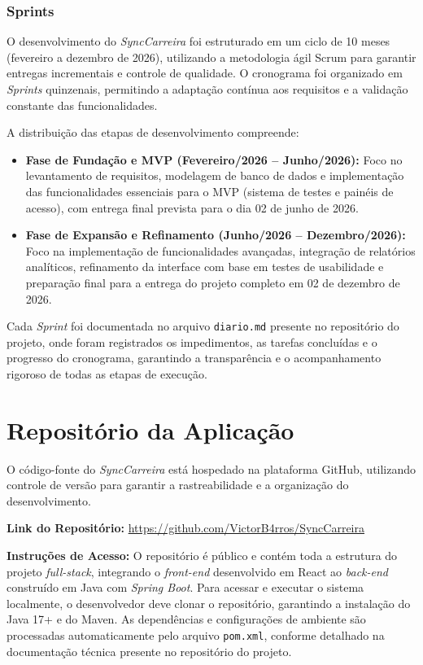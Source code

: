 \subsubsection{Sprints}

O desenvolvimento do \textit{SyncCarreira} foi estruturado em um ciclo de 10 meses (fevereiro a dezembro de 2026), utilizando a metodologia ágil Scrum para garantir entregas incrementais e controle de qualidade. O cronograma foi organizado em \textit{Sprints} quinzenais, permitindo a adaptação contínua aos requisitos e a validação constante das funcionalidades.

A distribuição das etapas de desenvolvimento compreende:

\begin{itemize}
    \item \textbf{Fase de Fundação e MVP (Fevereiro/2026 -- Junho/2026):} Foco no levantamento de requisitos, modelagem de banco de dados e implementação das funcionalidades essenciais para o MVP (sistema de testes e painéis de acesso), com entrega final prevista para o dia 02 de junho de 2026.

    \item \textbf{Fase de Expansão e Refinamento (Junho/2026 -- Dezembro/2026):} Foco na implementação de funcionalidades avançadas, integração de relatórios analíticos, refinamento da interface com base em testes de usabilidade e preparação final para a entrega do projeto completo em 02 de dezembro de 2026.
\end{itemize}

Cada \textit{Sprint} foi documentada no arquivo \texttt{diario.md} presente no repositório do projeto, onde foram registrados os impedimentos, as tarefas concluídas e o progresso do cronograma, garantindo a transparência e o acompanhamento rigoroso de todas as etapas de execução.

\section{Repositório da Aplicação}

O código-fonte do \textit{SyncCarreira} está hospedado na plataforma GitHub, utilizando controle de versão para garantir a rastreabilidade e a organização do desenvolvimento.

\noindent\textbf{Link do Repositório:} \url{https://github.com/VictorB4rros/SyncCarreira}

\noindent\textbf{Instruções de Acesso:} O repositório é público e contém toda a estrutura do projeto \textit{full-stack}, integrando o \textit{front-end} desenvolvido em React ao \textit{back-end} construído em Java com \textit{Spring Boot}. Para acessar e executar o sistema localmente, o desenvolvedor deve clonar o repositório, garantindo a instalação do Java 17+ e do Maven. As dependências e configurações de ambiente são processadas automaticamente pelo arquivo \texttt{pom.xml}, conforme detalhado na documentação técnica presente no repositório do projeto.
